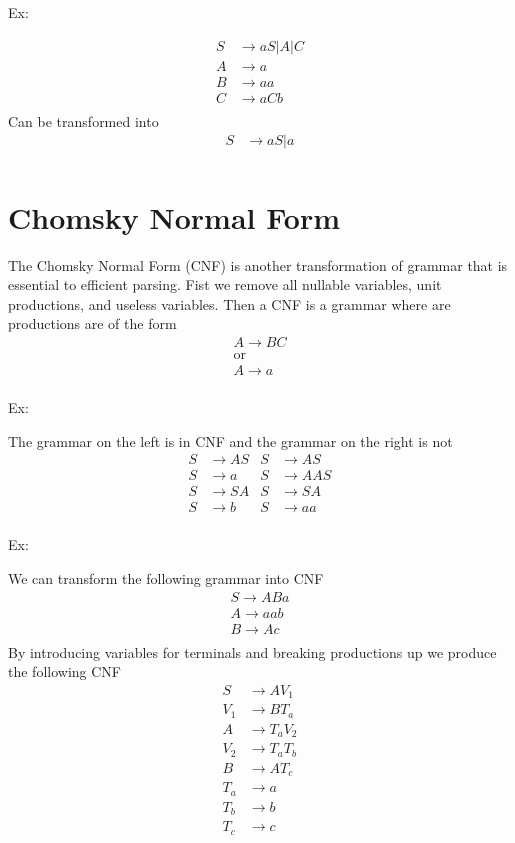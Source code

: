 \documentclass[11pt]{exam}
\begin{document}
Ex:
\begin{center}
\begin{align*}
S &\rightarrow aS | A | C\\
A &\rightarrow a\\
B &\rightarrow aa\\
C &\rightarrow aCb\\
\end{align*}
Can be transformed into 
\begin{align*}
S &\rightarrow aS | a \\
\end{align*}
\end{center}

\newpage

\section{Chomsky Normal Form}

The Chomsky Normal Form (CNF) is another transformation of grammar that is essential to efficient parsing. Fist we remove all nullable variables, unit productions, and useless variables. Then a CNF is a grammar where are productions are of the form
\begin{align*}
A \rightarrow BC\\
\text{or}\\
A \rightarrow a\\
\end{align*}

Ex:
\begin{center}
The grammar on the left is in CNF and the grammar on the right is not
\begin{align*}
S &\rightarrow AS & S &\rightarrow AS\\
S &\rightarrow a & S &\rightarrow AAS\\
S &\rightarrow SA & S &\rightarrow SA\\
S &\rightarrow b & S &\rightarrow aa\\
\end{align*}
\end{center}

Ex:
\begin{center}
We can transform the following grammar into CNF
\begin{align*}
S \rightarrow ABa\\
A \rightarrow aab\\
B \rightarrow Ac\\
\end{align*}
By introducing variables for terminals and breaking productions up we produce the following CNF
\begin{align*}
S &\rightarrow AV_1\\
V_1 &\rightarrow BT_a\\
A &\rightarrow T_aV_2\\
V_2 &\rightarrow T_aT_b\\
B &\rightarrow AT_c\\
T_a &\rightarrow a\\
T_b &\rightarrow b\\
T_c &\rightarrow c\\
\end{align*}
\end{center}
\end{document}
